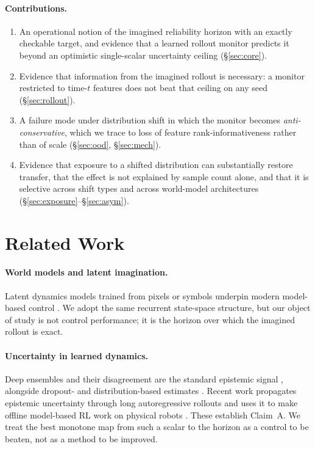 \documentclass[twocolumn,10pt]{article}
\begin{document}
\paragraph{Contributions.}
\begin{enumerate}\itemsep1pt
\item An operational notion of the imagined reliability horizon with an exactly checkable
target, and evidence that a learned rollout monitor predicts it beyond an optimistic
single-scalar uncertainty ceiling (\S\ref{sec:core}).
\item Evidence that information from the imagined rollout is necessary: a monitor restricted
to time-$t$ features does not beat that ceiling on any seed (\S\ref{sec:rollout}).
\item A failure mode under distribution shift in which the monitor becomes
\emph{anti-conservative}, which we trace to loss of feature rank-informativeness rather than of
scale (\S\ref{sec:ood}, \S\ref{sec:mech}).
\item Evidence that exposure to a shifted distribution can substantially restore transfer, that
the effect is not explained by sample count alone, and that it is selective across shift types
and across world-model architectures (\S\ref{sec:exposure}--\S\ref{sec:asym}).
\end{enumerate}

\section{Related Work}
\label{sec:related}

\paragraph{World models and latent imagination.}
Latent dynamics models trained from pixels or symbols underpin modern model-based control
\citep{ha2018world,hafner2019planet,hafner2020dream,hafner2021dreamerv2,hafner2023dreamerv3}.
We adopt the same recurrent state-space structure, but our object of study is not control
performance; it is the horizon over which the imagined rollout is exact.

\paragraph{Uncertainty in learned dynamics.}
Deep ensembles and their disagreement are the standard epistemic signal
\citep{lakshminarayanan2017ensembles,chua2018pets}, alongside dropout- and
distribution-based estimates \citep{gal2016dropout,kendall2017uncertainties}. Recent work
propagates epistemic uncertainty through long autoregressive rollouts and uses it to make
offline model-based RL work on physical robots \citep{li2025uncertainty}. These establish
Claim~A. We treat the best monotone map from such a scalar to the horizon as a control to be
beaten, not as a method to be improved.
\end{document}
